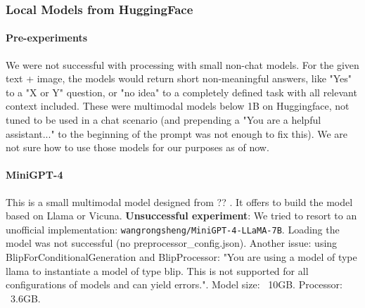\documentclass[10pt]{article}
\begin{document}
\subsubsection{Local Models from HuggingFace}

\paragraph{Pre-experiments} We were not successful with processing with small non-chat models. For the given text + image, the models would return short non-meaningful answers, like "Yes" to a "X or Y" question, or "no idea" to a completely defined task with all relevant context included. These were multimodal models below 1B on Huggingface, not tuned to be used in a chat scenario (and prepending a "You are a helpful assistant..." to the beginning of the prompt was not enough to fix this). 
We are not sure how to use those models for our purposes as of now. 

\paragraph{MiniGPT-4} This is a small multimodal model designed from ?? \cite{zhu2023minigpt}. It offers to build the model based on Llama or Vicuna. 
\textbf{Unsuccessful experiment}: We tried to resort to an unofficial implementation: \texttt{wangrongsheng/MiniGPT-4-LLaMA-7B}. Loading the model was not successful (no preprocessor\_config.json). 
Another issue: using BlipForConditionalGeneration and BlipProcessor: "You are using a model of type llama to instantiate a model of type blip. This is not supported for all configurations of models and can yield errors.". Model size: ~10GB. Processor: ~3.6GB. 
\end{document}
